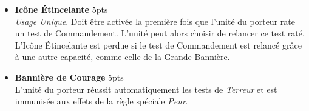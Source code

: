 \begin{multicols}{2}
\begin{itemize}[label={-}]
\item \textbf{Icône Étincelante} \dotfill \unit{5}{pts} \\
\emph{Usage Unique}. Doit être activée la première fois que l'unité du porteur rate un test de Commandement. L'unité peut alors choisir de relancer ce test raté. L'Icône Étincelante est perdue si le test de Commandement est relancé grâce à une autre capacité, comme celle de la Grande Bannière.

\item \textbf{Bannière de Courage} \dotfill \unit{5}{pts} \\
L'unité du porteur réussit automatiquement les tests de \emph{Terreur} et est immunisée aux effets de la règle spéciale \emph{Peur}.

\end{itemize}
\end{multicols}

